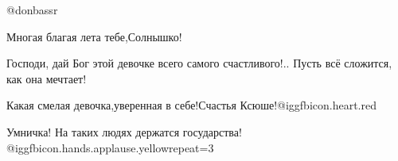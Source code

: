 @donbassr

\begin{itemize} %
Многая благая лета тебе,Солнышко!

Господи, дай Бог этой девочке всего самого счастливого!..
Пусть всё сложится, как она мечтает!

Какая смелая девочка,уверенная в себе!Счастья Ксюше!@igg{fbicon.heart.red}

Умничка! На таких людях держатся государства!  @igg{fbicon.hands.applause.yellow}{repeat=3} 
\end{itemize} %
